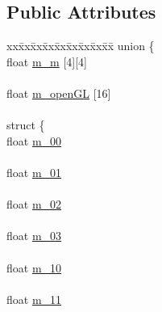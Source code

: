 \subsection*{Public Attributes}
\begin{DoxyCompactItemize}
\item 
\hypertarget{classMat4_a2cca9586be7e8f4776d52f91feaf7b0b}{
\begin{tabbing}
xx\=xx\=xx\=xx\=xx\=xx\=xx\=xx\=xx\=\kill
union \{\\
\>float \hyperlink{classMat4_a814619c2bc230d3d1b52dc1e72e33a10}{m\_m} \mbox{[}4\mbox{]}\mbox{[}4\mbox{]}\\
\>\\
\>float \hyperlink{classMat4_a81fc8afe42c23614ab86549aaf2f384c}{m\_openGL} \mbox{[}16\mbox{]}\\
\>\\
\hypertarget{unionMat4_1_1@0_a401018066c0f587c933117afe577f73f}{
\>struct \{\\
\>\>float \hyperlink{classMat4_a63ea3c0d4b9a6f53e33e33f1a0de23c0}{m\_00}\\
\>\>\\
\>\>float \hyperlink{classMat4_ab9e74db6fa2e1b95683c347b34df4ea4}{m\_01}\\
\>\>\\
\>\>float \hyperlink{classMat4_af0a3595e5a7fc1eac093faf648539e3d}{m\_02}\\
\>\>\\
\>\>float \hyperlink{classMat4_aff54f200fc9d27b0c360ef20114585b2}{m\_03}\\
\>\>\\
\>\>float \hyperlink{classMat4_a2db5bf4792a33eb8bc726d3bd8dcb522}{m\_10}\\
\>\>\\
\>\>float \hyperlink{classMat4_a6ebbf9e1c9e8dd962bcf5715cc03ab29}{m\_11}\\
}
\end{tabbing}}
\end{DoxyCompactItemize}
